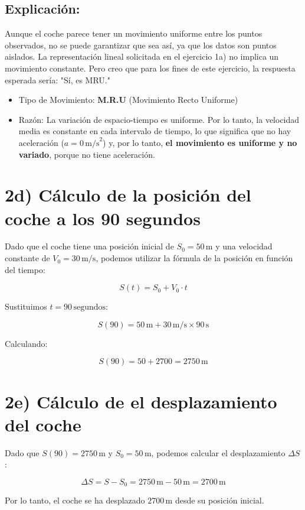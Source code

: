 \documentclass{article}
\begin{document}
\subsection*{Explicación:}

Aunque el coche parece tener un movimiento uniforme entre los puntos observados, no se puede garantizar que sea así, ya que los datos son puntos aislados. La representación lineal solicitada en el ejercicio 1a) no implica un movimiento constante.
Pero creo que para los fines de este ejercicio, la respuesta esperada sería: "Sí, es MRU."

\begin{itemize}
    \item Tipo de Movimiento: \textbf{M.R.U} (Movimiento Recto Uniforme)
    \item Razón: La variación de espacio-tiempo es uniforme. Por lo tanto, la velocidad media es constante en cada intervalo de tiempo, lo que significa que no hay aceleración (\(a = 0 \, \text{m/s}^2\)) y, por lo tanto, \textbf{el movimiento es uniforme y no variado}, porque no tiene aceleración. 
\end{itemize}


\section*{2d) Cálculo de la posición del coche a los 90 segundos}

Dado que el coche tiene una posición inicial de \(S_0 = 50 \, \text{m}\) y una velocidad constante de \(V_0 = 30 \, \text{m/s}\), podemos utilizar la fórmula de la posición en función del tiempo:

\[
S(t) = S_0 + V_0 \cdot t
\]

Sustituimos \(t = 90 \, \text{segundos}\):

\[
S(90) = 50 \, \text{m} + 30 \, \text{m/s} \times 90 \, \text{s}
\]

Calculando:

\[
S(90) = 50 + 2700 = \boxed{2750 \, \text{m}}
\]


\section*{2e) Cálculo de el desplazamiento del coche}

Dado que \( S(90) = 2750 \, \text{m} \) y \( S_0 = 50 \, \text{m} \), podemos calcular el desplazamiento \(\Delta S\):

\[
\Delta S = S - S_0 = 2750 \, \text{m} - 50 \, \text{m} = \boxed{2700 \, \text{m}}
\]

\justify
Por lo tanto, el coche se ha desplazado \( 2700 \, \text{m} \) desde su posición inicial.
\end{document}
